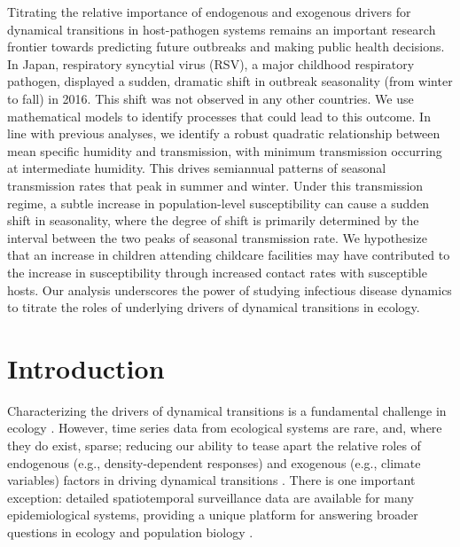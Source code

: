\documentclass[12pt]{article}
\begin{document}
Titrating the relative importance of endogenous and exogenous drivers for dynamical transitions in host-pathogen systems remains an important research frontier towards predicting future outbreaks and making public health decisions.
In Japan, respiratory syncytial virus (RSV), a major childhood respiratory pathogen, displayed a sudden, dramatic shift in outbreak seasonality (from winter to fall) in 2016. 
This shift was not observed in any other countries.
We use mathematical models to identify processes that could lead to this outcome.
In line with previous analyses, we identify a robust quadratic relationship between mean specific humidity and transmission, with minimum transmission occurring at intermediate humidity.
This drives semiannual patterns of seasonal transmission rates that peak in summer and winter.
Under this transmission regime, a subtle increase in population-level susceptibility can cause a sudden shift in seasonality, where the degree of shift is primarily determined by the interval between the two peaks of seasonal transmission rate.
We hypothesize that an increase in children attending childcare facilities may have contributed to the increase in susceptibility through increased contact rates with susceptible hosts.
Our analysis underscores the power of studying infectious disease dynamics to titrate the roles of underlying drivers of dynamical transitions in ecology.

\pagebreak

\section*{Introduction}

Characterizing the drivers of dynamical transitions is a fundamental challenge in ecology \citep{earn2000simple,hastings2004transients,hastings2018transient}.
However, time series data from ecological systems are rare, and, where they do exist, sparse; reducing our ability to tease apart the relative roles of endogenous (e.g., density-dependent responses) and exogenous (e.g., climate variables) factors in driving dynamical transitions \citep{hunter1998cycles,lundberg2000population,hernandez2012fluctuations}.
There is one important exception: detailed spatiotemporal surveillance data are available for many epidemiological systems, providing a unique platform for answering broader questions in ecology and population biology \citep{levin1997mathematical,anderson1991infectious,grenfell2001travelling,he2010plug}.
\end{document}
